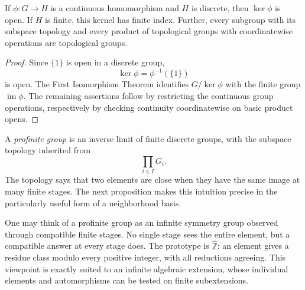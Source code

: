 \begin{proposition}
If \(\phi:G\to H\) is a continuous homomorphism and \(H\) is discrete, then
\(\ker\phi\) is open.  If \(H\) is finite, this kernel has finite index.
Further, every subgroup with its subspace topology and every product of
topological groups with coordinatewise operations are topological groups.
\end{proposition}
\begin{proof}
Since \(\{1\}\) is open in a discrete group,
\[
\ker\phi=\phi^{-1}(\{1\})
\]
is open.  The First Isomorphism Theorem identifies \(G/\ker\phi\) with the
finite group \(\operatorname{im}\phi\).  The remaining assertions follow by
restricting the continuous group operations, respectively by checking
continuity coordinatewise on basic product opens.
\end{proof}


\begin{definition}
A \emph{profinite group} is an inverse limit of finite discrete groups, with
the subspace topology inherited from
\[
\prod_{i\in I}G_i.
\]
The topology says that two elements are close when they have the same image at
many finite stages.  The next proposition makes this intuition precise in the
particularly useful form of a neighborhood basis.
\end{definition}

One may think of a profinite group as an infinite symmetry group observed
through compatible finite stages.  No single stage sees the entire element,
but a compatible answer at every stage does.
The prototype is \(\widehat{\mathbb Z}\): an element gives a residue class
modulo every positive integer, with all reductions agreeing.  This viewpoint
is exactly suited to an infinite algebraic extension, whose individual
elements and automorphisms can be tested on finite subextensions.

